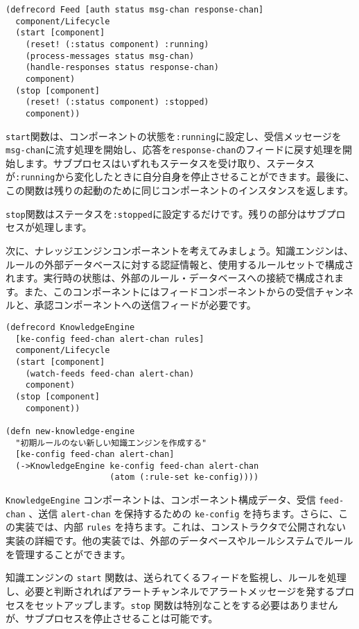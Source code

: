 \begin{lstlisting}[numbers=none]
(defrecord Feed [auth status msg-chan response-chan]
  component/Lifecycle
  (start [component]
    (reset! (:status component) :running)
    (process-messages status msg-chan)
    (handle-responses status response-chan)
    component)
  (stop [component]
    (reset! (:status component) :stopped)
    component))
\end{lstlisting}

\texttt{start}関数は、コンポーネントの状態を\texttt{:running}に設定し、受信メッセージを\texttt{msg-chan}に流す処理を開始し、応答を\texttt{response-chan}のフィードに戻す処理を開始します。サブプロセスはいずれもステータスを受け取り、ステータスが\texttt{:running}から変化したときに自分自身を停止させることができます。最後に、この関数は残りの起動のために同じコンポーネントのインスタンスを返します。

\texttt{stop}関数はステータスを\texttt{:stopped}に設定するだけです。残りの部分はサブプロセスが処理します。

次に、ナレッジエンジンコンポーネントを考えてみましょう。知識エンジンは、ルールの外部データベースに対する認証情報と、使用するルールセットで構成されます。実行時の状態は、外部のルール・データベースへの接続で構成されます。また、このコンポーネントにはフィードコンポーネントからの受信チャンネルと、承認コンポーネントへの送信フィードが必要です。

\begin{lstlisting}[numbers=none]
(defrecord KnowledgeEngine
  [ke-config feed-chan alert-chan rules]
  component/Lifecycle
  (start [component]
    (watch-feeds feed-chan alert-chan)
    component)
  (stop [component]
    component))

(defn new-knowledge-engine
  "初期ルールのない新しい知識エンジンを作成する"
  [ke-config feed-chan alert-chan]
  (->KnowledgeEngine ke-config feed-chan alert-chan
                     (atom (:rule-set ke-config))))
\end{lstlisting}

\texttt{KnowledgeEngine} コンポーネントは、コンポーネント構成データ、受信 \texttt{feed-chan} 、送信 \texttt{alert-chan} を保持するための \texttt{ke-config} を持ちます。さらに、この実装では、内部 \texttt{rules} を持ちます。これは、コンストラクタで公開されない実装の詳細です。他の実装では、外部のデータベースやルールシステムでルールを管理することができます。

知識エンジンの \texttt{start} 関数は、送られてくるフィードを監視し、ルールを処理し、必要と判断されればアラートチャンネルでアラートメッセージを発するプロセスをセットアップします。\texttt{stop} 関数は特別なことをする必要はありませんが、サブプロセスを停止させることは可能です。

